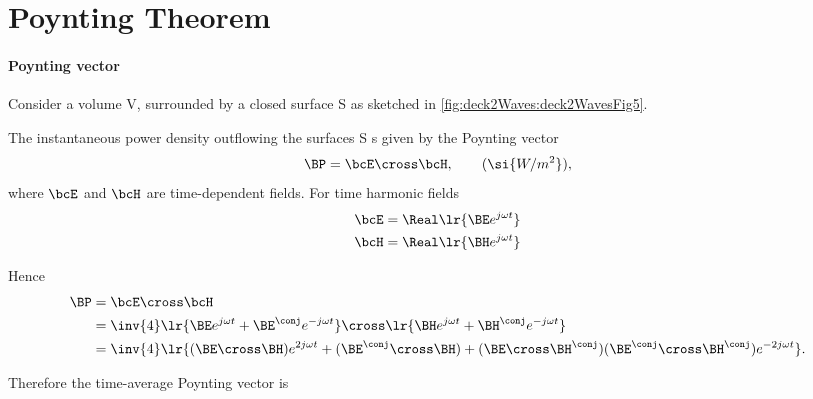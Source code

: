 \section{Poynting Theorem}

\paragraph{Poynting vector}

Consider a volume V, surrounded by a closed surface S as sketched in \cref{fig:deck2Waves:deck2WavesFig5}.


The instantaneous power density outflowing the surfaces S s given by the Poynting vector
\begin{equation}\label{eqn:uwavesLecture2:1120}
\BP = \bcE \cross \bcH, \qquad (\si{W/m^2}),
\end{equation}
where \( \bcE \) and \( \bcH \) are time-dependent fields.  For time harmonic fields
\begin{equation}\label{eqn:uwavesLecture2:1140}
\begin{aligned}
\bcE &= \Real \lr{ \BE e^{j \omega t} } \\
\bcH &= \Real \lr{ \BH e^{j \omega t} }
\end{aligned}
\end{equation}

Hence
\begin{equation}\label{eqn:uwavesLecture2:1160}
\begin{aligned}
\BP
&= \bcE \cross \bcH
\\ &= \inv{4}
\lr{ \BE e^{j \omega t} +  \BE^\conj e^{-j \omega t} }
\cross
\lr{ \BH e^{j \omega t} +  \BH^\conj e^{-j \omega t} }
\\ &=
\inv{4}
\lr{
(\BE \cross \BH) e^{2 j \omega t}
+ (\BE^\conj \cross \BH)
+ (\BE \cross \BH^\conj)
(\BE^\conj \cross \BH^\conj) e^{-2 j \omega t}
}.
\end{aligned}
\end{equation}

Therefore the time-average Poynting vector is


